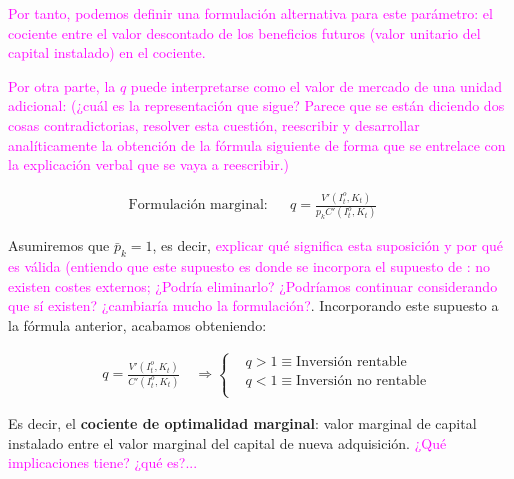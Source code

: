 \documentclass[10pt,a4paper]{article}
\begin{document}
\textcolor{magenta}{Por tanto, podemos definir una formulación alternativa para este parámetro: el cociente entre el valor descontado de los beneficios futuros (valor unitario del capital instalado) en el cociente.

Por otra parte, la $q$ puede interpretarse como el valor de mercado de una unidad adicional: (¿cuál es la representación que sigue? Parece que se están diciendo dos cosas contradictorias, resolver esta cuestión, reescribir y desarrollar analíticamente la obtención de la fórmula siguiente de forma que se entrelace con la explicación verbal que se vaya a reescribir.)}

$$\begin{aligned}
  \text{Formulación marginal}:&&q=\frac{V'(I_t^o, K_t)}{p_k C'(I_t^o,K_t)}\quad 
\end{aligned}$$

Asumiremos que $\bar p_k=1$, es decir, \textcolor{magenta}{explicar qué significa esta suposición y por qué es válida (entiendo que este supuesto es donde se incorpora el supuesto de : no existen costes externos; ¿Podría eliminarlo? ¿Podríamos continuar considerando que sí existen? ¿cambiaría mucho la formulación?}. Incorporando este supuesto a la fórmula anterior, acabamos obteniendo:


$$\begin{aligned}
  \quad \boxed{q=\frac{V'(I_t^o, K_t)}{C'(I_t^o,K_t)}}\quad\Longrightarrow
    \left\{\begin{aligned}
        &q>1\equiv\text{Inversión rentable}\\[0.5em]
        &q<1\equiv\text{Inversión no rentable}\\[0.5em]
    \end{aligned}\right.
\end{aligned}$$

Es decir, el \textbf{cociente de optimalidad marginal}: valor marginal de capital instalado entre el valor marginal del capital de nueva adquisición. \textcolor{magenta}{¿Qué implicaciones tiene? ¿qué es?...}
\end{document}
